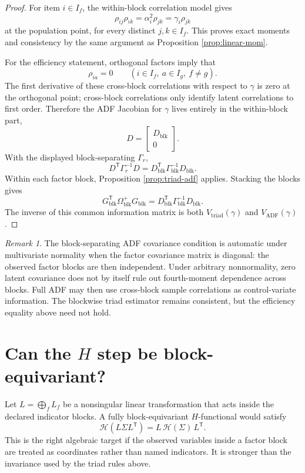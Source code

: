 \documentclass[11pt]{article}
\newcommand{\T}{^{\mathsf T}}
\theoremstyle{plain}
\theoremstyle{remark}
\newtheorem*{remark}{Remark}
\begin{document}
\begin{proof}
For item \(i\in I_f\), the within-block correlation model gives
\[
  \rho_{ij}\rho_{ik}
  =
  \alpha_i^2 \rho_{jk}
  =
  \gamma_i\rho_{jk}
\]
at the population point, for every distinct \(j,k\in I_f\). This proves exact
moments and consistency by the same argument as Proposition
\ref{prop:linear-mom}.

For the efficiency statement, orthogonal factors imply that
\[
  \rho_{ia}=0\qquad(i\in I_f,\ a\in I_g,\ f\ne g).
\]
The first derivative of these cross-block correlations with respect to
\(\gamma\) is zero at the orthogonal point; cross-block correlations only
identify latent correlations to first order. Therefore the ADF Jacobian for
\(\gamma\) lives entirely in the within-block part,
\[
  D=
  \begin{bmatrix}
    D_{\mathrm{blk}}\\
    0
  \end{bmatrix}.
\]
With the displayed block-separating \(\Gamma_r\),
\[
  D\T\Gamma_r^{-1}D
  =
  D_{\mathrm{blk}}\T\Gamma_{\mathrm{blk}}^{-1}D_{\mathrm{blk}} .
\]
Within each factor block, Proposition \ref{prop:triad-adf} applies. Stacking
the blocks gives
\[
  G_{\mathrm{blk}}\T\Omega_{\mathrm{blk}}^{+}G_{\mathrm{blk}}
  =
  D_{\mathrm{blk}}\T\Gamma_{\mathrm{blk}}^{-1}D_{\mathrm{blk}} .
\]
The inverse of this common information matrix is both
\(V_{\mathrm{triad}}(\gamma)\) and \(V_{\mathrm{ADF}}(\gamma)\).
\end{proof}

\begin{remark}
The block-separating ADF covariance condition is automatic under multivariate
normality when the factor covariance matrix is diagonal: the observed factor
blocks are then independent. Under arbitrary nonnormality, zero latent
covariance does not by itself rule out fourth-moment dependence across blocks.
Full ADF may then use cross-block sample correlations as control-variate
information. The blockwise triad estimator remains consistent, but the
efficiency equality above need not hold.
\end{remark}

\section{Can the \(H\) step be block-equivariant?}

Let \(L=\bigoplus_f L_f\) be a nonsingular linear transformation that acts
inside the declared indicator blocks. A fully block-equivariant \(H\)-functional
would satisfy
\begin{equation}\label{eq:block-equiv-H}
  \mathcal H(L\Sigma L\T)=L\,\mathcal H(\Sigma)\,L\T .
\end{equation}
This is the right algebraic target if the observed variables inside a factor
block are treated as coordinates rather than named indicators. It is stronger
than the invariance used by the triad rules above.
\end{document}
